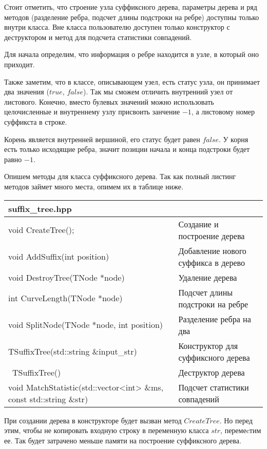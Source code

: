 Стоит отметить, что строение узла суффиксного дерева, параметры дерева и ряд методов 
(разделение ребра, подсчет длины подстроки на ребре) доступны только внутри класса. 
Вне класса пользователю доступен только конструктор с деструктором и метод для подсчета статистики совпадений.

Для начала определим, что информация о ребре находится в узле, в который оно приходит.

Также заметим, что в классе, описывающем узел, есть статус узла, он принимает два значения ($true$, $false$). 
Так мы сможем отличить внутренний узел от листового. Конечно, вместо булевых значений можно использовать целочисленные и 
внутреннему узлу присвоить занчение $-1$, а листовому номер суффикста в строке.

Корень является внутренней вершиной, его статус будет равен $false$. У корня есть только исходящие ребра, значит позиции начала и 
конца подстроки будет равно $-1$.

Опишем методы для класса суффиксного дерева. Так как полный листинг методов займет много места, опимем их в таблице ниже.
\begin{longtable}{|p{7.5cm}|p{7.5cm}|}
\hline
\rowcolor{lightgray}
\multicolumn{2}{|c|} {suffix\_tree.hpp}\\
\hline
void CreateTree();&Создание и построение дерева\\
\hline
\hline
void AddSuffix(int position)&Добавление нового суффикса в дерево\\
\hline
\hline
void DestroyTree(TNode *node)&Удаление дерева\\
\hline
\hline
int CurveLength(TNode *node)&Подсчет длины подстроки на ребре\\
\hline
\hline
void SplitNode(TNode *node, int position)&Разделение ребра на два\\
\hline
\hline
TSuffixTree(std::string \&input\_str)&Конструктор для суффиксного дерева\\
\hline
\hline
~TSuffixTree()&Деструктор дерева\\
\hline
\hline
void MatchStatistic(std::vector<int> \&ms, const std::string \&str)&Подсчет статистики совпадений\\
\hline
\end{longtable}


При создании дерева в конструкторе будет вызван метод $CreateTree$. Но перед этим, чтобы не копировать входную строку в 
переменную класса $str$, перемеcтим ее. Так будет затрачено меньше памяти на построение суффиксного дерева.


